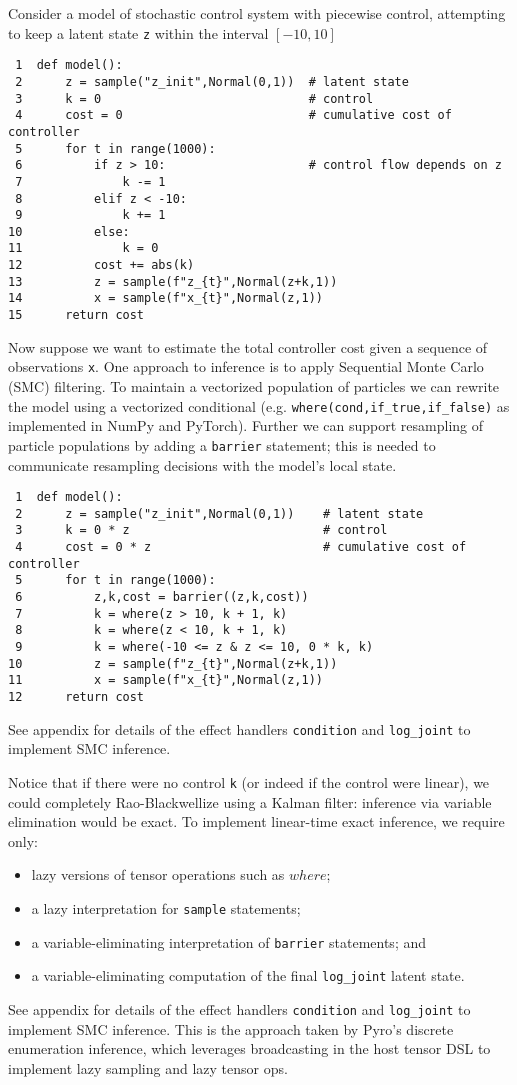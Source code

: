 \documentclass[anonymous=false, %
               format=acmsmall, %
               review=true, %
               screen=true, %
               nonacm=true]{acmart}
\begin{document}
Consider a model of stochastic control system with piecewise control, attempting to keep a latent state \verb$z$ within the interval $[-10,10]$
\begin{verbatim}
 1  def model():
 2      z = sample("z_init",Normal(0,1))  # latent state
 3      k = 0                             # control
 4      cost = 0                          # cumulative cost of controller
 5      for t in range(1000):
 6          if z > 10:                    # control flow depends on z
 7              k -= 1
 8          elif z < -10:
 9              k += 1
10          else:
11              k = 0
12          cost += abs(k)
13          z = sample(f"z_{t}",Normal(z+k,1))
14          x = sample(f"x_{t}",Normal(z,1))
15      return cost
\end{verbatim}
Now suppose we want to estimate the total controller cost given a sequence of observations \verb$x$.
One approach to inference is to apply Sequential Monte Carlo (SMC) filtering.
To maintain a vectorized population of particles we can rewrite the model using a vectorized conditional (e.g. \verb$where(cond,if_true,if_false)$ as implemented in NumPy and PyTorch).
Further we can support resampling of particle populations by adding a \verb$barrier$ statement; this is needed to communicate resampling decisions with the model's local state.
\begin{verbatim}
 1  def model():
 2      z = sample("z_init",Normal(0,1))    # latent state
 3      k = 0 * z                           # control
 4      cost = 0 * z                        # cumulative cost of controller
 5      for t in range(1000):
 6          z,k,cost = barrier((z,k,cost))
 7          k = where(z > 10, k + 1, k)
 8          k = where(z < 10, k + 1, k)
 9          k = where(-10 <= z & z <= 10, 0 * k, k)
10          z = sample(f"z_{t}",Normal(z+k,1))
11          x = sample(f"x_{t}",Normal(z,1))
12      return cost
\end{verbatim}
See appendix \label{sec:appendix:smc} for details of the effect handlers \verb$condition$ and \verb$log_joint$ to implement SMC inference.

Notice that if there were no control \verb$k$ (or indeed if the control were linear), we could completely Rao-Blackwellize using a Kalman filter: inference via variable elimination would be exact.
To implement linear-time exact inference, we require only:
\begin{itemize}
  \item lazy versions of tensor operations such as $where$;
  \item a lazy interpretation for \verb$sample$ statements;
  \item a variable-eliminating interpretation of \verb$barrier$ statements; and
  \item a variable-eliminating computation of the final \verb$log_joint$ latent state.
\end{itemize}
See appendix \label{sec:appendix:exact} for details of the effect handlers \verb$condition$ and \verb$log_joint$ to implement SMC inference.
This is the approach taken by Pyro's discrete enumeration inference, which leverages broadcasting in the host tensor DSL to implement lazy sampling and lazy tensor ops.
\end{document}
